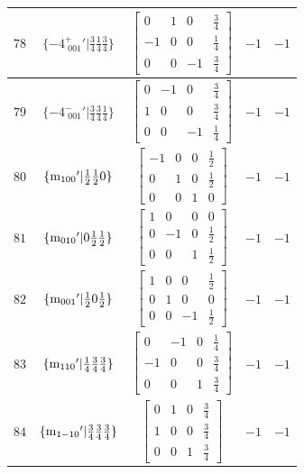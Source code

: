 \documentclass[fleqn,8pt]{jsarticle}
\begin{document}
\begin{longtable}{ccccc}
$ 78 $ & $ \{-4^{+}_{\,\,001}{}'|\frac{3}{4} \frac{1}{4} \frac{3}{4}\} $ & $ \begin{bmatrix} 0 & 1 & 0 & \frac{3}{4} \\ -1 & 0 & 0 & \frac{1}{4} \\ 0 & 0 & -1 & \frac{3}{4} \end{bmatrix} $ & $ -1 $ & $ -1 $ \\ \hline
$ 79 $ & $ \{-4^{-}_{\,\,001}{}'|\frac{3}{4} \frac{3}{4} \frac{1}{4}\} $ & $ \begin{bmatrix} 0 & -1 & 0 & \frac{3}{4} \\ 1 & 0 & 0 & \frac{3}{4} \\ 0 & 0 & -1 & \frac{1}{4} \end{bmatrix} $ & $ -1 $ & $ -1 $ \\ \hline
$ 80 $ & $ \{{\rm m}_{100}{}'|\frac{1}{2} \frac{1}{2} 0\} $ & $ \begin{bmatrix} -1 & 0 & 0 & \frac{1}{2} \\ 0 & 1 & 0 & \frac{1}{2} \\ 0 & 0 & 1 & 0 \end{bmatrix} $ & $ -1 $ & $ -1 $ \\ \hline
$ 81 $ & $ \{{\rm m}_{010}{}'|0 \frac{1}{2} \frac{1}{2}\} $ & $ \begin{bmatrix} 1 & 0 & 0 & 0 \\ 0 & -1 & 0 & \frac{1}{2} \\ 0 & 0 & 1 & \frac{1}{2} \end{bmatrix} $ & $ -1 $ & $ -1 $ \\ \hline
$ 82 $ & $ \{{\rm m}_{001}{}'|\frac{1}{2} 0 \frac{1}{2}\} $ & $ \begin{bmatrix} 1 & 0 & 0 & \frac{1}{2} \\ 0 & 1 & 0 & 0 \\ 0 & 0 & -1 & \frac{1}{2} \end{bmatrix} $ & $ -1 $ & $ -1 $ \\ \hline
$ 83 $ & $ \{{\rm m}_{110}{}'|\frac{1}{4} \frac{3}{4} \frac{3}{4}\} $ & $ \begin{bmatrix} 0 & -1 & 0 & \frac{1}{4} \\ -1 & 0 & 0 & \frac{3}{4} \\ 0 & 0 & 1 & \frac{3}{4} \end{bmatrix} $ & $ -1 $ & $ -1 $ \\ \hline
$ 84 $ & $ \{{\rm m}_{1-10}{}'|\frac{3}{4} \frac{3}{4} \frac{3}{4}\} $ & $ \begin{bmatrix} 0 & 1 & 0 & \frac{3}{4} \\ 1 & 0 & 0 & \frac{3}{4} \\ 0 & 0 & 1 & \frac{3}{4} \end{bmatrix} $ & $ -1 $ & $ -1 $ \\ \hline

\end{longtable}
\end{document}
